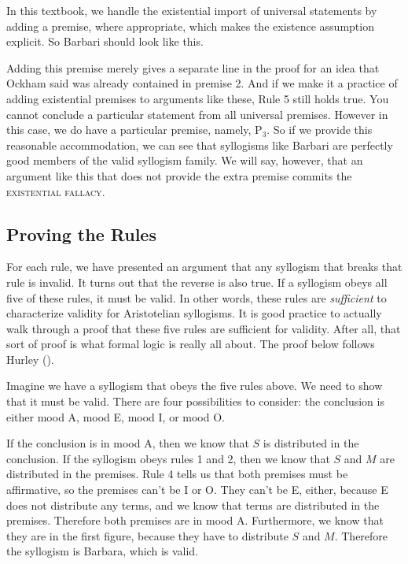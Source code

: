 In this textbook, we handle the existential import of universal statements by adding a premise, where appropriate, which makes the existence assumption explicit. So Barbari should look like this.

\begin{kormanize}
\end{kormanize}

Adding this premise merely gives a separate line in the proof for an idea that Ockham said was already contained in premise 2. And if we make it a practice of adding existential premises to arguments like these, Rule 5 still holds true. You cannot conclude a particular statement from all universal premises. However in this case, we do have a particular premise, namely, P$_3$. So if we provide this reasonable accommodation, we can see that syllogisms like Barbari are perfectly good members of the valid syllogism family. We will say, however, that an argument like this that does not provide the extra premise commits the
\textsc{\gls{existential fallacy}}. \label{def:existential_fallacy}


\subsection{Proving the Rules}

For each rule, we have presented an argument that any syllogism that breaks that rule is invalid. It turns out that the reverse is also true. If a syllogism obeys all five of these rules, it must be valid. In other words, these rules are \emph{sufficient} to characterize validity for Aristotelian syllogisms. It is good practice to actually walk through a proof that these five rules are sufficient for validity. After all, that sort of proof is what formal logic is really all about. The proof below follows Hurley (\cite{Hurley2014}).

Imagine we have a syllogism that obeys the five rules above. We need to show that it must be valid. There are four possibilities to consider: the conclusion is either mood A, mood E, mood I, or mood O.

If the conclusion is in mood A, then we know that $S$ is distributed in the conclusion. If the syllogism obeys rules 1 and 2, then we know that $S$ and $M$ are distributed in the premises. Rule 4 tells us that both premises must be affirmative, so the premises can't be I or O. They can't be E, either, because E does not distribute any terms, and we know that terms are distributed in the premises. Therefore both premises are in mood A. Furthermore, we know that they are in the first figure, because they have to distribute $S$ and $M$. Therefore the syllogism is Barbara, which is valid.

